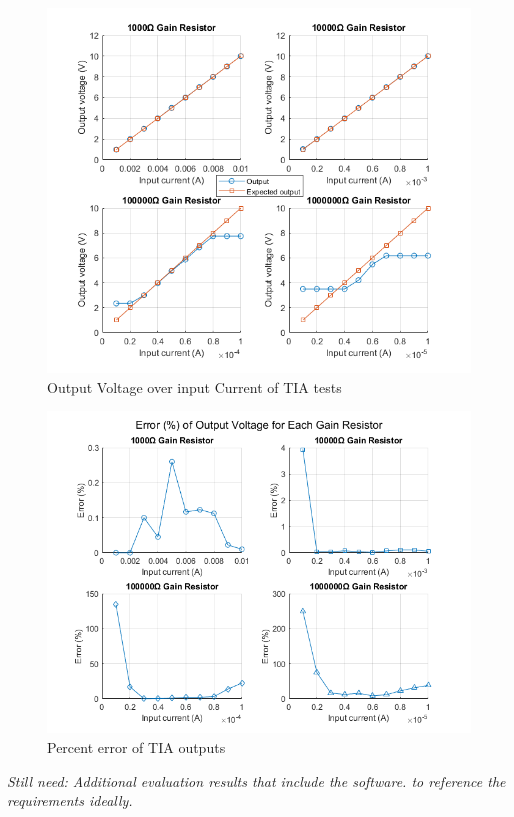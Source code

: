 \documentclass[conference]{IEEEtran}
\begin{document}
\begin{figure}
    \centering
    \includegraphics[width=\linewidth]{TIA_VvsI.png}
    \caption{Output Voltage over input Current of TIA tests}
    \label{fig:11}
\end{figure}

\begin{figure}
    \centering
    \includegraphics[width=\linewidth]{TIA_Error.png}
    \caption{Percent error of TIA outputs}
    \label{fig:12}
\end{figure}

\textit{Still need: Additional evaluation results that include the software. to reference the requirements ideally.}
\end{document}

